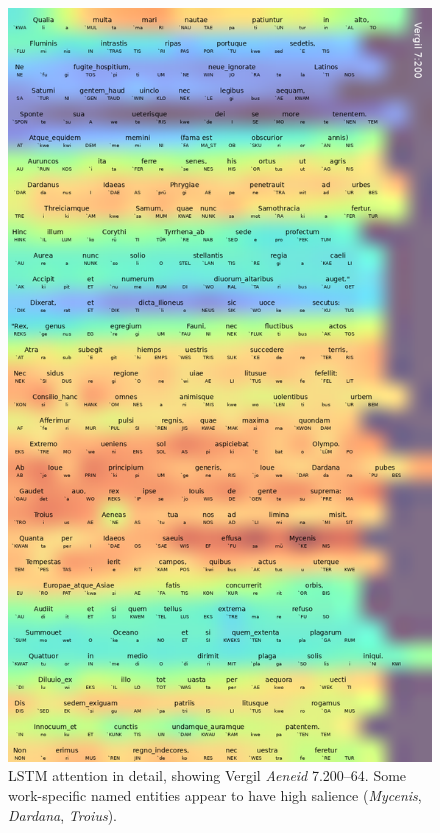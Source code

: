 \documentclass[
    twocolumn,
    hf,
]{ceurart}
\begin{document}
\begin{figure}
    \includegraphics[width=\linewidth]{figures/aen_7200.png}
    \caption{LSTM attention in detail, showing Vergil \emph{Aeneid}
        7.200--64. Some work-specific named entities appear to have high salience
        (\emph{Mycenis}, \emph{Dardana}, \emph{Troius}\textellipsis).}
    \label{fig:verg_lstm}
\end{figure}
\end{document}
